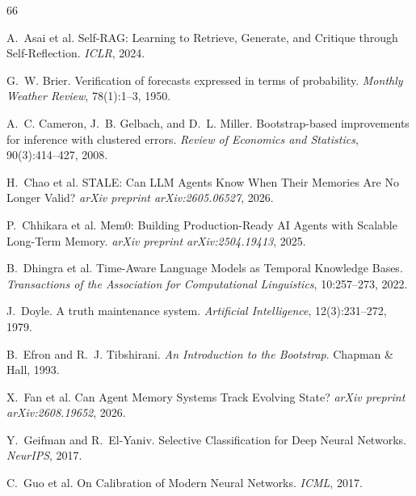 \documentclass{article}
\begin{document}
\begin{thebibliography}{66}


A.~Asai et al. Self-RAG: Learning to Retrieve, Generate, and Critique through Self-Reflection. \emph{ICLR}, 2024.

G.~W. Brier. Verification of forecasts expressed in terms of probability. \emph{Monthly Weather Review}, 78(1):1--3, 1950.

A.~C. Cameron, J.~B. Gelbach, and D.~L. Miller. Bootstrap-based improvements for inference with clustered errors. \emph{Review of Economics and Statistics}, 90(3):414--427, 2008.

H.~Chao et al. STALE: Can LLM Agents Know When Their Memories Are No Longer Valid? \emph{arXiv preprint arXiv:2605.06527}, 2026.

P.~Chhikara et al. Mem0: Building Production-Ready AI Agents with Scalable Long-Term Memory. \emph{arXiv preprint arXiv:2504.19413}, 2025.

B.~Dhingra et al. Time-Aware Language Models as Temporal Knowledge Bases. \emph{Transactions of the Association for Computational Linguistics}, 10:257--273, 2022.

J.~Doyle. A truth maintenance system. \emph{Artificial Intelligence}, 12(3):231--272, 1979.

B.~Efron and R.~J. Tibshirani. \emph{An Introduction to the Bootstrap}. Chapman \& Hall, 1993.

X.~Fan et al. Can Agent Memory Systems Track Evolving State? \emph{arXiv preprint arXiv:2608.19652}, 2026.

Y.~Geifman and R.~El-Yaniv. Selective Classification for Deep Neural Networks. \emph{NeurIPS}, 2017.

C.~Guo et al. On Calibration of Modern Neural Networks. \emph{ICML}, 2017.


\end{thebibliography}
\end{document}

